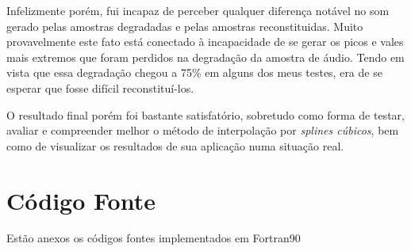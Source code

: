 Infelizmente porém, fui incapaz de perceber qualquer diferença notável no som gerado pelas amostras degradadas e pelas amostras reconstituidas. Muito provavelmente este fato está conectado à incapacidade de se gerar os picos e vales mais extremos que foram perdidos na degradação da amostra de áudio. Tendo em vista que essa degradação chegou a 75\% em alguns dos meus testes, era de se esperar que fosse difícil reconstituí-los.

O resultado final porém foi bastante satisfatório, sobretudo como forma de testar, avaliar e compreender melhor o método de interpolação por \textit{splines cúbicos}, bem como de visualizar os resultados de sua aplicação numa situação real.

\section{Código Fonte}

Estão anexos os códigos fontes implementados em Fortran90
